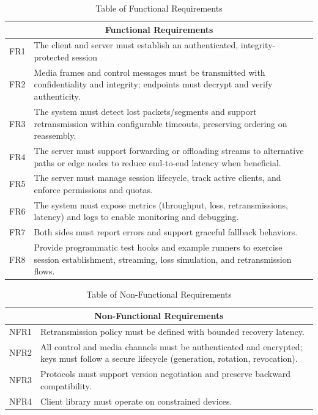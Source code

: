 \begin{table}[H]
	\centering
	\begin{tabular}{|p{2.2cm}|p{11.5cm}|}
		\hline
		\multicolumn{2}{|c|}{\textbf{Functional Requirements}} \\
		\hline
		FR1 & The client and server must establish an authenticated, integrity-protected session \\
		\hline
		FR2 & Media frames and control messages must be transmitted with confidentiality and integrity; endpoints must decrypt and verify authenticity. \\
		\hline
		FR3 & The system must detect lost packets/segments and support retransmission within configurable timeouts, preserving ordering on reassembly. \\
		\hline
		FR4 & The server must support forwarding or offloading streams to alternative paths or edge nodes to reduce end-to-end latency when beneficial. \\
		\hline
		FR5 & The server must manage session lifecycle, track active clients, and enforce permissions and quotas. \\
		\hline
		FR6 & The system must expose metrics (throughput, loss, retransmissions, latency) and logs to enable monitoring and debugging. \\
		\hline
		FR7 & Both sides must report errors and support graceful fallback behaviors. \\
		\hline
		FR8 & Provide programmatic test hooks and example runners to exercise session establishment, streaming, loss simulation, and retransmission flows. \\
		\hline
	\end{tabular}
	\caption{Table of Functional Requirements}
	\label{tab:functional-reqs}
\end{table}

\begin{table}[H]
	\centering
	\begin{tabular}{|p{2.2cm}|p{11.5cm}|}
		\hline
		\multicolumn{2}{|c|}{\textbf{Non-Functional Requirements}} \\
		\hline
		NFR1 & Retransmission policy must be defined with bounded recovery latency. \\
		\hline
		NFR2 & All control and media channels must be authenticated and encrypted; keys must follow a secure lifecycle (generation, rotation, revocation). \\
		\hline
		NFR3 & Protocols must support version negotiation and preserve backward compatibility. \\
		\hline
		NFR4 & Client library must operate on constrained devices.\\
		\hline
	\end{tabular}
	\caption{Table of Non-Functional Requirements}
	\label{tab:nonfunctional-reqs}
\end{table}


